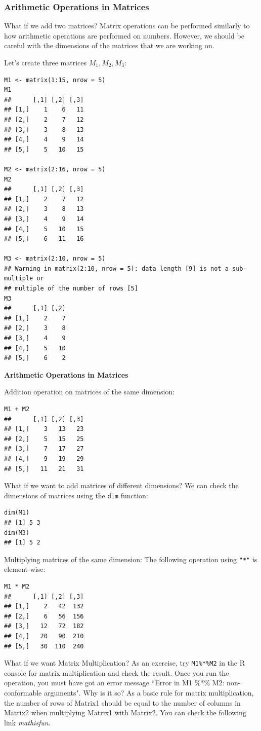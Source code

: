\documentclass[12pt]{book}
\begin{document}
\subsubsection{Arithmetic Operations in Matrices}

What if we add two matrices? Matrix operations can be performed similarly to how arithmetic operations are performed on numbers. However, we should be careful with the dimensions of the matrices that we are working on.

Let’s create three matrices \( M_1, M_2, M_3 \):

\begin{verbatim}
M1 <- matrix(1:15, nrow = 5)
M1
##      [,1] [,2] [,3]
## [1,]    1    6   11
## [2,]    2    7   12
## [3,]    3    8   13
## [4,]    4    9   14
## [5,]    5   10   15

M2 <- matrix(2:16, nrow = 5)
M2
##      [,1] [,2] [,3]
## [1,]    2    7   12
## [2,]    3    8   13
## [3,]    4    9   14
## [4,]    5   10   15
## [5,]    6   11   16

M3 <- matrix(2:10, nrow = 5)
## Warning in matrix(2:10, nrow = 5): data length [9] is not a sub-multiple or
## multiple of the number of rows [5]
M3
##      [,1] [,2]
## [1,]    2    7
## [2,]    3    8
## [3,]    4    9
## [4,]    5   10
## [5,]    6    2
\end{verbatim}

\textbf{Arithmetic Operations in Matrices}

Addition operation on matrices of the same dimension:

\begin{verbatim}
M1 + M2
##      [,1] [,2] [,3]
## [1,]    3   13   23
## [2,]    5   15   25
## [3,]    7   17   27
## [4,]    9   19   29
## [5,]   11   21   31
\end{verbatim}

What if we want to add matrices of different dimensions? We can check the dimensions of matrices using the \texttt{dim} function:

\begin{verbatim}
dim(M1)
## [1] 5 3
dim(M3)
## [1] 5 2
\end{verbatim}

Multiplying matrices of the same dimension: The following operation using \texttt{"*"} is element-wise:

\begin{verbatim}
M1 * M2
##      [,1] [,2] [,3]
## [1,]    2   42  132
## [2,]    6   56  156
## [3,]   12   72  182
## [4,]   20   90  210
## [5,]   30  110  240
\end{verbatim}
What if we want Matrix Multiplication? As an exercise, try \texttt{M1\%*\%M2} in the R console for matrix multiplication and check the result. Once you run the operation, you must have got an error message ``Error in M1 \%*\% M2: non-conformable arguments". Why is it so? As a basic rule for matrix multiplication, the number of rows of Matrix1 should be equal to the number of columns in Matrix2 when multiplying Matrix1 with Matrix2. You can check the following link \textit{mathisfun}.
\end{document}
